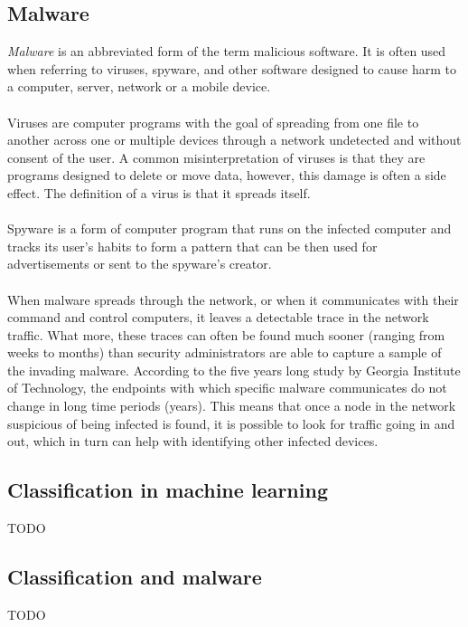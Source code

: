 \documentclass[11pt]{article}
\begin{document}
    \subsection{Malware}
      {\it Malware} is an abbreviated form of the term malicious software. It is often used when referring to viruses, spyware, and other software designed to cause harm to a computer, server, network or a mobile device. \citep{malware}
      \\~\\
      Viruses are computer programs with the goal of spreading from one file to another across one or multiple devices through a network undetected and without consent of the user. A common misinterpretation of viruses is that they are programs designed to delete or move data, however, this damage is often a side effect. The definition of a virus is that it spreads itself. \citep{malware}
      \\~\\
      Spyware is a form of computer program that runs on the infected computer and tracks its user's habits to form a pattern that can be then used for advertisements or sent to the spyware's creator. \citep{malware}
      \\~\\
      When malware spreads through the network, or when it communicates with their command and control computers, it leaves a detectable trace in the network traffic. What more, these traces can often be found much sooner (ranging from weeks to months) than security administrators are able to capture a sample of the invading malware. \citep{network} According to the five years long study by Georgia Institute of Technology, the endpoints with which specific malware communicates do not change in long time periods (years). This means that once a node in the network suspicious of being infected is found, it is possible to look for traffic going in and out, which in turn can help with identifying other infected devices. \citep{network}
      \newpage
    \subsection{Classification in machine learning}
      {\color{red}TODO}
      \newpage
    \subsection{Classification and malware}
      {\color{red}TODO}
  \newpage
\end{document}
